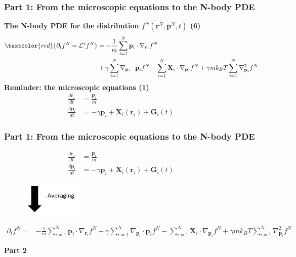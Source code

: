 \documentclass[aspectratio=169,xcolor=dvipsnames]{beamer}
\begin{document}
\begin{frame}
	\frametitle{Part 1: From the microscopic equations to the N-body PDE}
	\textbf{The N-body PDE for the distribution $f^N(\mathbf{r}^N, \mathbf{p}^N,t)$ (6)}
	\begin{align*}
    \textcolor{red}{\partial_t f^N = \mathcal{L}^* f^N }&= - \frac{1}{m} \sum_{i=1}^N \mathbf{p}_i \cdot \nabla_{\mathbf{r}_i} f^N\\
    &+ \gamma \sum_{i = 1}^N \nabla_{\mathbf{p}_i}
    \cdot \mathbf{p}_i f^N - \sum_{i=1}^N \mathbf{X}_i \cdot \nabla_{\mathbf{p}_i}f^N + \gamma m k_BT \sum_{i=1}^N \nabla^2_{\mathbf{p}_i}f^N	
	\end{align*}
	\textbf{Reminder: the microscopic equations (1)}
	\begin{align*}
	\frac{d \mathbf{r}_i}{dt} &= \frac{\mathbf{p}_i}{m}\\
	\frac{d \mathbf{p}_i}{dt} &= - \gamma \mathbf{p}_i + \mathbf{X}_i(\mathbf{r}_i) + \mathbf{G}_i(t) \qquad \quad
	\end{align*}
\end{frame}
\begin{frame}
	\frametitle{Part 1: From the microscopic equations to the N-body PDE}
	
	\begin{align*}
	\frac{d \mathbf{r}_i}{dt} &= \frac{\mathbf{p}_i}{m}\\
	\frac{d \mathbf{p}_i}{dt} &= - \gamma \mathbf{p}_i + \mathbf{X}_i(\mathbf{r}_i) + \mathbf{G}_i(t) \qquad \quad
	\end{align*}
	\vspace{-0.5cm}
	\begin{figure}
		\includegraphics[width=3cm]{Arrow2.png}
	\end{figure}
	\vspace{-0.3cm}
	\begin{align*}
	\partial_t f^N = &- \frac{1}{m} \sum_{i=1}^N \mathbf{p}_i \cdot \nabla_{\mathbf{r}_i} f^N + \gamma \sum_{i = 1}^N \nabla_{\mathbf{p}_i}
	\cdot \mathbf{p}_i f^N - \sum_{i=1}^N \mathbf{X}_i \cdot \nabla_{\mathbf{p}_i}f^N + \gamma m k_BT \sum_{i=1}^N \nabla^2_{\mathbf{p}_i}f^N	
	\end{align*}
	
\end{frame}
\begin{frame}
	\centering
	\textbf{ \huge Part 2}
\end{frame}
\end{document}
